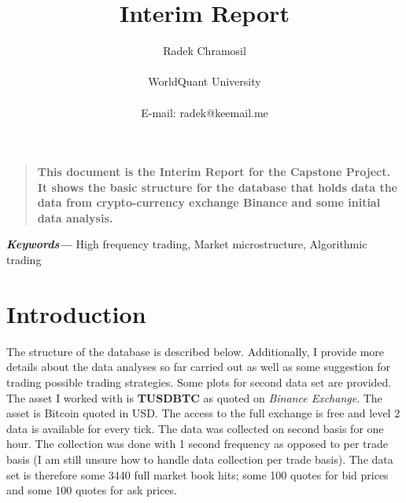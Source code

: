 \documentclass[12pt]{article}
\title{Interim Report}
\author
{Radek Chramosil\\
\\
\normalsize{WorldQuant University}\\
\\
\normalsize{E-mail:  radek@keemail.me}
}
\date{}
\newenvironment{sciabstract}{%
\begin{quote} \bf}
{\end{quote}}
\providecommand{\keywords}[1]
{
  \small	
  \textbf{\textit{Keywords---}} #1
}
\begin{document}
 


\baselineskip24pt


\maketitle 




\begin{sciabstract}
This document is the Interim Report for the Capstone Project. It shows the basic structure for the database that holds data the data from crypto-currency exchange Binance and some initial data analysis.
\end{sciabstract}

\keywords{High frequency trading, Market microstructure, Algorithmic trading}



\section*{Introduction}
The structure of the database is described below. Additionally,  I provide more details about the data analyses so far carried out as well as some suggestion for trading possible trading strategies. Some plots for second data set are provided. The asset I worked with is \textbf{TUSDBTC} as quoted on \textit{Binance Exchange}. The asset is Bitcoin quoted in USD. The access to the full exchange is free and level 2 data is available for every tick. The data was collected on second basis for one hour. The collection was done with 1 second frequency as opposed to per trade basis (I am still unsure how to handle data collection per trade basis). The data set is therefore some 3440 full market book hits; some 100 quotes for bid prices and some 100 quotes for ask prices.
\end{document}
